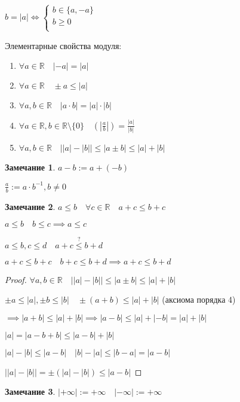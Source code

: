 \documentclass{book}
\newcommand\R{\ensuremath{\mathbb{R}}}
\theoremstyle{definition}
\newtheorem*{note}{Замечание}
\begin{document}
        \begin{property}
            $b=|a| \iff  \begin{cases}
                b\in \{a, -a\}\\
                b\geqslant 0\\
            \end{cases}$
        \end{property}

        Элементарные свойства модуля:
        \begin{enumerate}
            \item $\forall a\in \R\quad |-a| =|a|$
            \item $\forall a\in \R\quad \pm a \leqslant  |a|$
            \item $\forall  a, b\in \R\quad |a\cdot b| = |a|\cdot |b|$
            \item $\forall a\in \R, b\in \R\setminus \{0\}\quad(\left| \frac{a}{b} \right| ) = \frac{|a|}{|b|}$
            \item $\forall a, b\in \R\quad \left| |a| - |b| \right| \leqslant |a\pm b| \leqslant |a|+|b|$
        \end{enumerate}
        \begin{note}
            $a-b := a+(-b)$

            $\frac{a}{b}:= a\cdot b^{-1}, b\neq 0$
        \end{note}
        \begin{note}
            $a\leqslant b\quad\forall c\in \R\quad a+c\leqslant b+c$

            $a\leqslant b\quad b\leqslant c \implies a\leqslant c$

            $a\leqslant b, c\leqslant d\quad a+c\overset{?}{\leqslant} b+d$

            $a+c\leqslant b+c\quad b+c\leqslant b+d \implies a+c\leqslant b+d$
        \end{note}
        \begin{proof}
            $\forall a, b\in \R\quad \left| |a| - |b| \right| \leqslant |a\pm b| \leqslant |a|+|b|$

            $\pm a\leqslant |a|,\pm b\leqslant |b|\quad \pm(a+b)\leqslant |a| + |b| $ (аксиома порядка 4)

            $\implies |a+b|\leqslant |a| + |b| \implies |a-b|\leqslant |a| + |-b| = |a| + |b|$

            $|a| = |a-b+b| \leqslant |a-b| + |b|$

            $|a| - |b|\leqslant |a-b|\quad |b| - |a| \leqslant |b-a| = |a-b|$

            $\left| |a| - |b| \right| =  \pm (|a| - |b|) \leqslant |a-b|$
        \end{proof}
        \begin{note}
            $|+\infty | := +\infty \quad |-\infty | := +\infty $
        \end{note}
\end{document}
